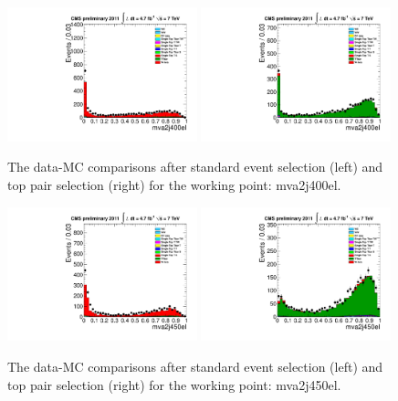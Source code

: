 \begin{figure}[!t]
  \centering
  \includegraphics[width=0.49\textwidth]{figs/cl-mva2j400el-normal.pdf}
  \includegraphics[width=0.49\textwidth]{figs/cl-mva2j400el-inTTbar.pdf}
  \caption{\label{fig:mva:plots-mva2j400el} The data-MC comparisons
    after standard event selection (left) and top pair
    selection (right) for the working point: mva2j400el.}
\end{figure}

\begin{figure}[!t]
  \centering
  \includegraphics[width=0.49\textwidth]{figs/cl-mva2j450el-normal.pdf}
  \includegraphics[width=0.49\textwidth]{figs/cl-mva2j450el-inTTbar.pdf}
  \caption{\label{fig:mva:plots-mva2j450el} The data-MC comparisons
    after standard event selection (left) and top pair
    selection (right) for the working point: mva2j450el.}
\end{figure}

